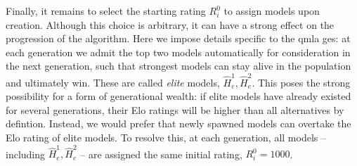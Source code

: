 {\par 
Finally, it remains to select the starting rating $R_i^0$ to assign models upon creation. 
Although this choice is arbitrary, it can have a strong effect on the progression of the algorithm. 
Here we impose details specific to the \gls{qmla} \gls{ges}: 
    at each generation we admit the top two  models automatically 
    for consideration in the next generation, 
    such that strongest models can stay alive in the population and ultimately win. 
These are called \emph{elite} models, $\hat{H}_e^1, \hat{H}_e^2$. 
This poses the strong possibility for a form of generational wealth:
    if elite models have already existed for several generations, 
    their \glspl{Elo rating} will be higher than all alternatives by defintion. 
Instead, we would prefer that newly spawned models can overtake the \gls{Elo rating} of elite models. 
To resolve this, at each generation, all models -- including $\hat{H}_e^1, \hat{H}_e^2$ -- 
    are assigned the same initial rating, $R_i^0=1000$. 

    

}
